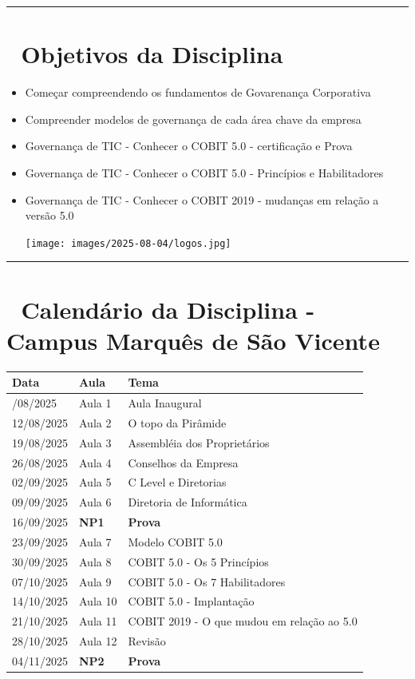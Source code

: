 \documentclass[
]{book}
\begin{document}
\begin{center}\rule{0.5\linewidth}{0.5pt}\end{center}

\section{🎯 Objetivos da Disciplina}\label{objetivos-da-disciplina}

\begin{itemize}
\item
  Começar compreendendo os fundamentos de Govarenança Corporativa
\item
  Compreender modelos de governança de cada área chave da empresa
\item
  Governança de TIC - Conhecer o COBIT 5.0 - certificação e Prova
\item
  Governança de TIC - Conhecer o COBIT 5.0 - Princípios e Habilitadores
\item
  Governança de TIC - Conhecer o COBIT 2019 - mudanças em relação a versão 5.0

  \texttt{[image: images/2025-08-04/logos.jpg]}
\end{itemize}

\begin{center}\rule{0.5\linewidth}{0.5pt}\end{center}

\section{📅 Calendário da Disciplina - Campus Marquês de São Vicente}\label{calenduxe1rio-da-disciplina---campus-marquuxeas-de-suxe3o-vicente}

\begin{longtable}[]{@{}lll@{}}
\toprule\noalign{}
Data & Aula & Tema \\
\midrule\noalign{}
\endhead
\bottomrule\noalign{}
\endlastfoot
05/08/2025 & Aula 1 & Aula Inaugural \\
12/08/2025 & Aula 2 & O topo da Pirâmide \\
19/08/2025 & Aula 3 & Assembléia dos Proprietários \\
26/08/2025 & Aula 4 & Conselhos da Empresa \\
02/09/2025 & Aula 5 & C Level e Diretorias \\
09/09/2025 & Aula 6 & Diretoria de Informática \\
16/09/2025 & \textbf{NP1} & \textbf{Prova} \\
23/09/2025 & Aula 7 & Modelo COBIT 5.0 \\
30/09/2025 & Aula 8 & COBIT 5.0 - Os 5 Princípios \\
07/10/2025 & Aula 9 & COBIT 5.0 - Os 7 Habilitadores \\
14/10/2025 & Aula 10 & COBIT 5.0 - Implantação \\
21/10/2025 & Aula 11 & COBIT 2019 - O que mudou em relação ao 5.0 \\
28/10/2025 & Aula 12 & Revisão \\
04/11/2025 & \textbf{NP2} & \textbf{Prova} \\
\end{longtable}
\end{document}
